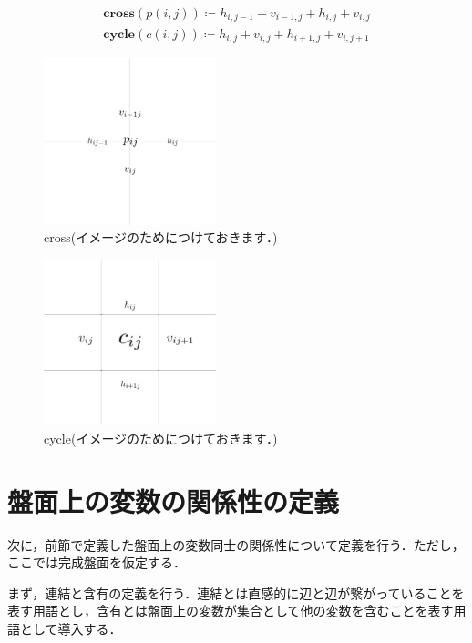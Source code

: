 \begin{definition}\textup{}\label{definition:Function}
  \begin{align}
    \bm{cross}(p(i,j))\coloneqq h_{i,j-1}+v_{i-1,j}+h_{i,j}+v_{i,j} \\
    \bm{cycle}(c(i,j))\coloneqq h_{i,j}+v_{i,j}+h_{i+1,j}+v_{i,j+1}
  \end{align}
\end{definition}
\begin{figure}[htbp]\label{fig:cross}
  \centering
  \includegraphics[width=5cm]{fig/cross.png}
  \caption{cross(イメージのためにつけておきます．)}
\end{figure}

\begin{figure}[htbp]\label{fig:cycle}
  \centering
  \includegraphics[width=5cm]{fig/cycle.png}
  \caption{cycle(イメージのためにつけておきます．)}
\end{figure}


\section{盤面上の変数の関係性の定義}\label{section:RelationDefinition}

次に，前節で定義した盤面上の変数同士の関係性について定義を行う．ただし，ここでは完成盤面を仮定する．

まず，連結と含有の定義を行う．連結とは直感的に辺と辺が繋がっていることを表す用語とし，含有とは盤面上の変数が集合として他の変数を含むことを表す用語として導入する．

